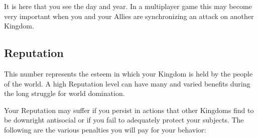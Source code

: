 
It is here that you see the day and year. In a multiplayer game this may become very important when you and your Allies are synchronizing an attack on another Kingdom.

\subsection{Reputation}

This number represents the esteem in which your Kingdom is held by the people of the world. A high Reputation level can have many and varied benefits during the long struggle for world domination.

Your Reputation may suffer if you persist in actions that other Kingdoms find to be downright antisocial or if you fail to adequately protect your subjects. The following are the various penalties you will pay for your behavior:


